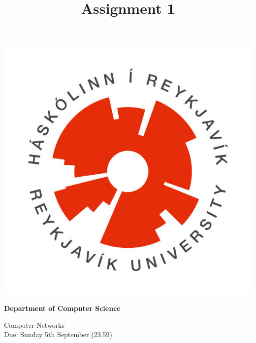 \documentclass[9pt, addpoints]{exam}
\title{Assignment 1}
\begin{document}
\noindent
\begin{minipage}[l]{.11\textwidth}%
\noindent
    \includegraphics[width=\textwidth]{HR}
\end{minipage}%
\begin{minipage}[r]{.6\textwidth}%
\begin{center}
    {\large\bfseries Department of Computer Science \par
    \large Computer Networks \\[2pt]
    \large Due: Sunday 5th September (23.59)
    }
\end{center}
\end{minipage}%
%
\end{document}
